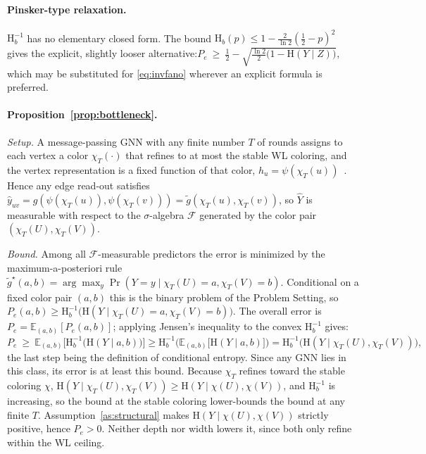 \documentclass[sigconf]{acmart}
\newcommand{\Hh}{\mathrm{H}}
\theoremstyle{plain}
\theoremstyle{definition}
\begin{document}
\paragraph{Pinsker-type relaxation.} $\Hh_b^{-1}$ has no elementary closed form. The bound $\Hh_b(p)\le 1-\tfrac{2}{\ln 2}(\tfrac12-p)^2$~\citep{yeung2008information} gives the explicit, slightly looser alternative:$
P_e\ \ge\ \tfrac12-\sqrt{\tfrac{\ln 2}{2}\big(1-\Hh(Y\mid Z)\big)},$ which may be substituted for \eqref{eq:invfano} wherever an explicit formula is preferred.

\paragraph{Proposition~\ref{prop:bottleneck}.}
\emph{Setup.} A message-passing GNN with any finite number $T$ of rounds assigns to each vertex a color $\chi_T(\cdot)$ that refines to at most the stable WL coloring, and the vertex representation is a fixed function of that color, $h_u=\psi(\chi_T(u))$~\citep{xu2019powerful,morris2019weisfeiler}. Hence any edge read-out satisfies $\hat y_{uv}=g(\psi(\chi_T(u)),\psi(\chi_T(v)))=\tilde g(\chi_T(u),\chi_T(v))$, so $\hat Y$ is measurable with respect to the $\sigma$-algebra $\mathcal{F}$ generated by the color pair $(\chi_T(U),\chi_T(V))$.

\emph{Bound.} Among all $\mathcal{F}$-measurable predictors the error is minimized by the maximum-a-posteriori rule $\tilde g^\star(a,b)=\arg\max_y \Pr(Y=y\mid \chi_T(U)=a,\chi_T(V)=b)$. Conditional on a fixed color pair $(a,b)$ this is the binary problem of the Problem Setting, so $P_e(a,b)\ge \Hh_b^{-1}\big(\Hh(Y\mid \chi_T(U)=a,\chi_T(V)=b)\big)$. The overall error is $P_e=\mathbb{E}_{(a,b)}[P_e(a,b)]$; applying Jensen's inequality to the convex $\Hh_b^{-1}$ gives:$
P_e \ \ge\ \mathbb{E}_{(a,b)}\Big[\Hh_b^{-1}\big(\Hh(Y\mid a,b)\big)\Big]  \ge 
\Hh_b^{-1}\Big(\mathbb{E}_{(a,b)}\big[\Hh(Y\mid a,b)\big]\Big) =
 \Hh_b^{-1}\big(\Hh(Y\mid \chi_T(U),\chi_T(V))\big),
$
the last step being the definition of conditional entropy. Since any GNN lies in this class, its error is at least this bound. Because $\chi_T$ refines toward the stable coloring $\chi$, $\Hh(Y\mid \chi_T(U),\chi_T(V))\ge \Hh(Y\mid \chi(U),\chi(V))$, and $\Hh_b^{-1}$ is increasing, so the bound at the stable coloring lower-bounds the bound at any finite $T$. Assumption~\ref{as:structural} makes $\Hh(Y\mid \chi(U),\chi(V))$ strictly positive, hence $P_e>0$. Neither depth nor width lowers it, since both only refine within the WL ceiling.
\end{document}
